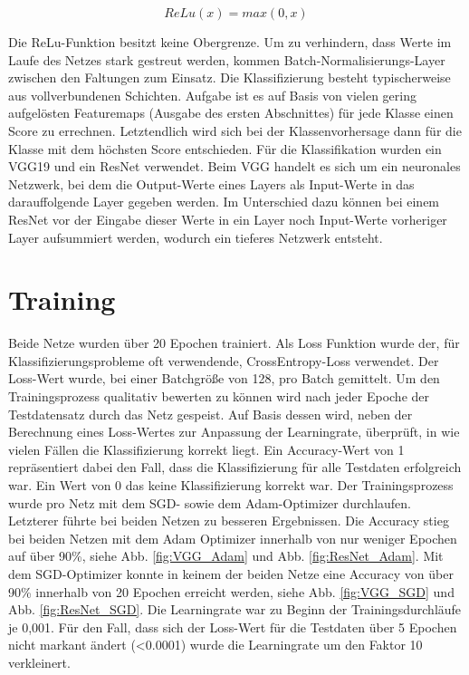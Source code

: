 \documentclass[sigconf]{acmart}
\begin{document}
\begin{equation}\label{ReLu}
ReLu(x) = max(0,x)
\end{equation}


\noindent Die ReLu-Funktion besitzt keine Obergrenze. Um zu verhindern, dass Werte im Laufe des Netzes stark gestreut werden, kommen Batch-Normalisierungs-Layer \cite{ioffe2015batch} zwischen den Faltungen zum Einsatz. 
Die Klassifizierung besteht typischerweise aus vollverbundenen Schichten. Aufgabe ist es auf Basis von vielen gering aufgelösten Featuremaps (Ausgabe des ersten Abschnittes) für jede Klasse einen Score zu errechnen. Letztendlich wird sich bei der Klassenvorhersage dann für die Klasse mit dem höchsten Score entschieden. 
Für die Klassifikation wurden ein VGG19 und ein ResNet verwendet. Beim VGG handelt es sich um ein neuronales Netzwerk, bei dem die Output-Werte eines Layers als Input-Werte in das darauffolgende Layer gegeben werden. Im Unterschied dazu können bei einem ResNet vor der Eingabe dieser Werte in ein Layer noch Input-Werte vorheriger Layer aufsummiert werden, wodurch ein tieferes Netzwerk entsteht. 

\section{Training}
\label{section:training}
Beide Netze wurden über 20 Epochen trainiert. Als Loss Funktion wurde der, für Klassifizierungsprobleme oft verwendende, CrossEntropy-Loss verwendet. Der Loss-Wert wurde, bei einer Batchgröße von 128, pro Batch gemittelt.  
Um den Trainingsprozess qualitativ bewerten zu können wird nach jeder Epoche der Testdatensatz durch das Netz gespeist. Auf Basis dessen wird, neben der Berechnung eines Loss-Wertes zur Anpassung der Learningrate, überprüft, in wie vielen Fällen die Klassifizierung korrekt liegt.  Ein Accuracy-Wert von 1 repräsentiert dabei den Fall, dass die Klassifizierung für alle Testdaten erfolgreich war. Ein Wert von 0 das keine Klassifizierung korrekt war. 
Der Trainingsprozess wurde pro Netz mit dem SGD- sowie dem Adam-Optimizer durchlaufen. Letzterer führte bei beiden Netzen zu besseren Ergebnissen. Die Accuracy stieg bei beiden Netzen mit dem Adam Optimizer innerhalb von nur weniger Epochen auf über 90\%, siehe Abb. \ref{fig:VGG_Adam} und Abb. \ref{fig:ResNet_Adam}. Mit dem SGD-Optimizer konnte in keinem der beiden Netze eine Accuracy von über 90\% innerhalb von 20 Epochen erreicht werden, siehe Abb. \ref{fig:VGG_SGD} und Abb. \ref{fig:ResNet_SGD}.
\newline
\newline
Die Learningrate war zu Beginn der Trainingsdurchläufe je 0,001. Für den Fall, dass sich der Loss-Wert für die Testdaten über 5 Epochen nicht markant ändert (<0.0001) wurde die Learningrate um den Faktor 10 verkleinert. 
\end{document}
